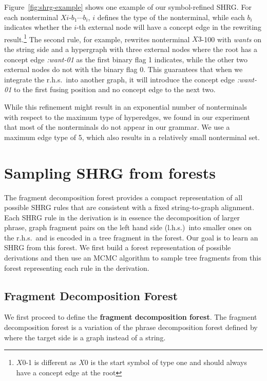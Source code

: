 Figure~\ref{fig:shrg-example} shows one example of our symbol-refined SHRG\@.
For each nonterminal $Xi$-$b_1\cdots b_i$, $i$ defines the type of the nonterminal, while
each $b_i$ indicates whether the $i$-th external node will have a concept edge
in the rewriting result.\footnote{$X0$-1 is different as $X0$ is the start symbol of type one and should always have a concept edge at the root}
The second rule, for example, rewrites nonterminal $X3$-100 with {\em wants} on the string side and a hypergraph with three external nodes where 
the root has a concept edge {\em :want-01} as the first binary flag 1 indicates, while the other two external nodes do not with the binary flag 0. 
This guarantees that when we integrate the r.h.s.\ into
another graph, it will introduce the concept edge {\em :want-01} to the first fusing position
and no concept edge to the next two.


While this refinement might result in an exponential number of nonterminals with respect to the maximum type of hyperedges, 
we found in our experiment that most of the nonterminals
do not appear in our grammar. We use a maximum edge type of 5, which also results in a relatively small nonterminal set.
\section{Sampling SHRG from forests}
The fragment decomposition forest provides a compact representation of all possible SHRG rules that are consistent with a fixed string-to-graph 
alignment. Each SHRG rule in the derivation is in essence the decomposition of 
larger phrase, graph fragment pairs on the left hand side (l.h.s.)\ into smaller ones on the r.h.s.\ and is
encoded in a tree fragment in the forest. Our goal is to learn an SHRG from this forest.
We first build a forest representation of possible derivations and then use an MCMC algorithm to
sample tree fragments from this forest representing each rule in the derivation.
\subsection{Fragment Decomposition Forest}
We first proceed to define the {\bf fragment decomposition forest}. The fragment decomposition forest is a variation of
the phrase decomposition forest defined by  where the target side is a graph instead of a string.


